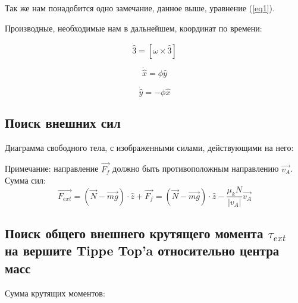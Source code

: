 \documentclass[a4paper,11.5pt]{article} %
\begin{document}
Так же нам понадобится одно замечание, данное выше, уравнение (\ref{eq1}).

Производные, необходимые нам в дальнейшем, координат по времени:

\begin{equation}
\boxed{
	\dot{\hat{3}} = \left[\omega \times \hat{3}\right]
}
	\label{eq6}
\end{equation}

\begin{equation}
	\dot{\hat{x}} = \phi \hat{y}
	\label{eq7}
\end{equation}

\begin{equation}
	\dot{\hat{y}} = -\phi \hat{x}
	\label{eq8}
\end{equation}

\subsection{Поиск внешних сил}

Диаграмма свободного тела, с изображенными силами, действующими на него:

\begin{figure}[h]
	\caption{}
	\label{figimage5}
\end{figure}

Примечание: направление $\overrightarrow{F_f}$ должно быть противоположным направлению $\overrightarrow{v_A}$. Сумма сил:
\begin{equation}
	\overrightarrow{F_{ext}} = (\overrightarrow{N} - \overrightarrow{mg})\cdot \hat{z} + \overrightarrow{F_f} = (\overrightarrow{N} - \overrightarrow{mg})\cdot \hat{z} - \frac{\mu_k N}{|v_A|}\overrightarrow{v_A}
	\label{eq9}
\end{equation}

\subsection{Поиск общего внешнего крутящего момента $\tau_{ext}$ на вершите Tippe Top'a относительно центра масс}
Сумма крутящих моментов:
\end{document}
